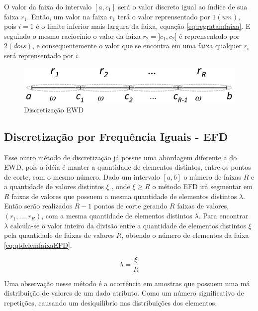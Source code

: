 O valor da faixa do intervalo ${[a,c_1]}$ será o valor discreto igual ao índice de sua faixa ${r_1}$. Então, um valor na faixa ${r_1}$ terá o valor reprensentado por ${1(um)}$, pois  ${i=1}$ é o limite inferior mais largura da faixa, equação \ref{eq:regratamfaixa}. E seguindo o mesmo raciocínio o valor da faixa ${r_2=]c_1,c_2]}$ é reprensentado por ${2(dois)}$, e consequentemente o valor que se encontra em uma faixa qualquer ${r_i}$ será reprensentado por ${i}$.

\begin{figure}[h] 
        \centering
        \includegraphics[scale=0.6]{figs/discretizacaoEWD.png}
        \caption[Discretização EWD]{Discretização EWD \footnotemark } 
        \label{fig:faixasEWD}
\end{figure}



\subsection{Discretização por Frequência Iguais - EFD}\label{cap:refTeor:subsec:efd}

Esse outro método de discretização já possue uma abordagem diferente a do EWD, pois a idéia é manter a quantidade de elementos distintos, entre os pontos de corte, com o mesmo número. Dado um intervalo ${[a,b]}$ o número de faixas ${R}$ e a quantidade de valores distintos ${\xi}$ , onde ${\xi \geqslant R}$ o método EFD irá segmentar em  ${R}$ faixas de valores que possuem a mesma quantidade de elementos distintos ${\lambda}$. Então serão realizados ${R-1}$ pontos de corte gerando ${R}$ faixas de valores, ${(r_1,...,r_R)}$, com a mesma quantidade de elementos distintos ${\lambda}$. Para encontrar ${\lambda}$ calcula-se o valor inteiro da divisão entre a quantidade de elementos distintos ${\xi}$ pela quantidade de faixas de valores ${R}$, obtendo o número de elementos da faixa \ref{eq:qtdelemfaixaEFD}.

\begin{equation}
\lambda = \frac{\xi}{R}
 \label{eq:qtdelemfaixaEFD}
\end{equation}

Uma observação nesse método é a ocorrência em amostras que possuem uma má distribuição de valores de um dado atributo. Como um número significativo de repetições, causando um desiquilíbrio nas distribuições dos elementos.

